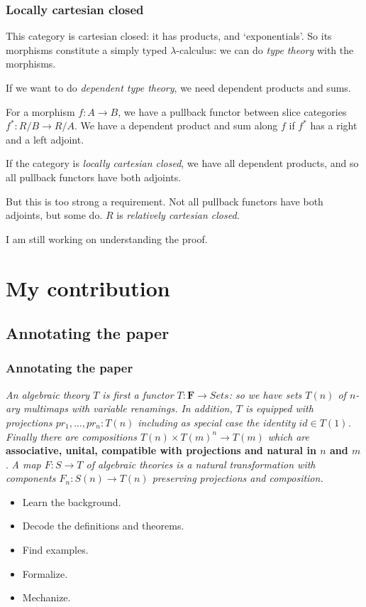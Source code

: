 \documentclass[aspectratio=169]{fancyslides} %
\begin{document}
  \begin{frame}
    \frametitle{Locally cartesian closed}
    This category is cartesian closed: it has products, and `exponentials'. So its morphisms constitute a simply typed $ \lambda $-calculus: we can do \textit{type theory} with the morphisms.

    \pause

    If we want to do \textit{dependent type theory}, we need dependent products and sums.

    For a morphism $ f: A \to B $, we have a pullback functor between slice categories $ f^*: R / B \to R / A $. We have a dependent product and sum along $ f $ if $ f^* $ has a right and a left adjoint.

    If the category is \textit{locally cartesian closed}, we have all dependent products, and so all pullback functors have both adjoints.

    \pause

    But this is too strong a requirement. Not all pullback functors have both adjoints, but some do. $ R $ is \textit{relatively cartesian closed}.

    \pause

    I am still working on understanding the proof.
  \end{frame}

  \section{My contribution}
  \frame{\tableofcontents[currentsection]}

  \subsection{Annotating the paper}
  \begin{frame}
    \frametitle{Annotating the paper}

    \textit{An algebraic theory $ T $ is first a functor $ T : \mathbf{F} \to Sets $: so we have sets $ T(n) $ of $ n $-ary multimaps with variable renamings. In addition, $ T $ is equipped with projections $ pr_1, \dots, pr_n : T(n) $ including as special case the identity $ id \in T(1) $. Finally there are compositions $ T(n) \times T(m)^n \to T(m) $ which are} \textbf{associative, unital, compatible with projections and natural in $ n $ and $ m $}. \textit{A map $ F : S \to T $ of algebraic theories is a natural transformation with components $ F_n : S(n) \to T(n) $ preserving projections and composition.}

    \pause

    \begin{itemize}
      \item Learn the background.
      \item Decode the definitions and theorems.
      \item Find examples.
      \item Formalize.
      \item Mechanize.
    \end{itemize}

  \end{frame}
\end{document}
